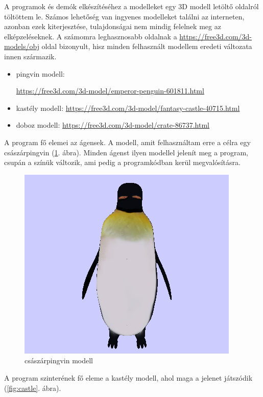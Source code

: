 A programok és demók elkészítéséhez a modelleket egy 3D modell letöltő oldalról töltöttem le. Számos lehetőség van ingyenes modelleket találni az interneten,
azonban ezek kiterjesztése, tulajdonságai nem mindig felelnek meg az elképzeléseknek.
A számomra leghasznosabb oldalnak a \url{https://free3d.com/3d-models/obj} oldal bizonyult, hisz minden felhasznált modellem eredeti változata innen származik.
\begin{itemize}
\item pingvin modell:

\url{https://free3d.com/3d-model/emperor-penguin-601811.html}
\item kastély modell: \url{https://free3d.com/3d-model/fantasy-castle-40715.html}
\item doboz modell: \url{https://free3d.com/3d-model/crate-86737.html}
\end{itemize}

A program fő elemei az ágensek. 
A modell, amit felhasználtam erre a célra egy császárpingvin (\ref{fig:pingvin}. ábra). 
Minden ágenst ilyen modellel jelenít meg a program, csupán a színük változik, ami pedig a programkódban kerül megvalósításra.

\begin{figure}[htp]
    \centering
   	\includegraphics[scale=0.6]{images/pingvin.png}
	\caption{császárpingvin modell}
	\label{fig:pingvin}
\end{figure}

A program szinterének fő eleme a kastély modell, ahol maga a jelenet játszódik (\ref{fig:castle}. ábra).

